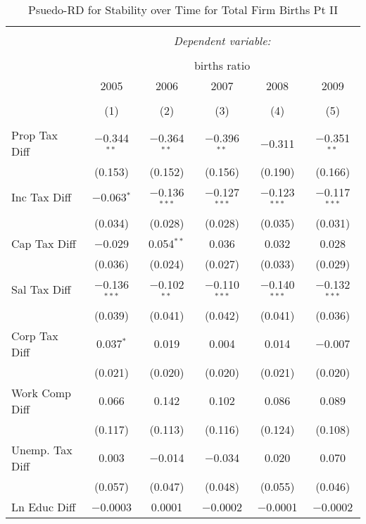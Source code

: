 
\begin{table}[!htbp] \centering 
  \caption{Psuedo-RD for Stability over Time for  Total Firm Births Pt II} 
  \label{--year} 
\small 
\begin{tabular}{@{\extracolsep{5pt}}lccccc} 
\\[-1.8ex]\hline 
\hline \\[-1.8ex] 
 & \multicolumn{5}{c}{\textit{Dependent variable:}} \\ 
\cline{2-6} 
\\[-1.8ex] & \multicolumn{5}{c}{births ratio} \\ 
 & 2005 & 2006 & 2007 & 2008 & 2009 \\ 
\\[-1.8ex] & (1) & (2) & (3) & (4) & (5)\\ 
\hline \\[-1.8ex] 
 Prop Tax Diff & $-$0.344$^{**}$ & $-$0.364$^{**}$ & $-$0.396$^{**}$ & $-$0.311 & $-$0.351$^{**}$ \\ 
  & (0.153) & (0.152) & (0.156) & (0.190) & (0.166) \\ 
  Inc Tax Diff & $-$0.063$^{*}$ & $-$0.136$^{***}$ & $-$0.127$^{***}$ & $-$0.123$^{***}$ & $-$0.117$^{***}$ \\ 
  & (0.034) & (0.028) & (0.028) & (0.035) & (0.031) \\ 
  Cap Tax Diff & $-$0.029 & 0.054$^{**}$ & 0.036 & 0.032 & 0.028 \\ 
  & (0.036) & (0.024) & (0.027) & (0.033) & (0.029) \\ 
  Sal Tax Diff & $-$0.136$^{***}$ & $-$0.102$^{**}$ & $-$0.110$^{***}$ & $-$0.140$^{***}$ & $-$0.132$^{***}$ \\ 
  & (0.039) & (0.041) & (0.042) & (0.041) & (0.036) \\ 
  Corp Tax Diff & 0.037$^{*}$ & 0.019 & 0.004 & 0.014 & $-$0.007 \\ 
  & (0.021) & (0.020) & (0.020) & (0.021) & (0.020) \\ 
  Work Comp Diff & 0.066 & 0.142 & 0.102 & 0.086 & 0.089 \\ 
  & (0.117) & (0.113) & (0.116) & (0.124) & (0.108) \\ 
  Unemp. Tax Diff & 0.003 & $-$0.014 & $-$0.034 & 0.020 & 0.070 \\ 
  & (0.057) & (0.047) & (0.048) & (0.055) & (0.046) \\ 
  Ln Educ Diff & $-$0.0003 & 0.0001 & $-$0.0002 & $-$0.0001 & $-$0.0002 \\ 

\end{tabular}
\end{table}
